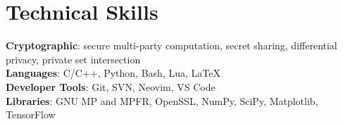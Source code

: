 \documentclass[letterpaper,11pt]{article}
\begin{document}
%
\section{Technical Skills}
\begin{itemize}[leftmargin=0.15in, label={}]
    \small{\item{
          \textbf{Cryptographic}{: secure multi-party computation, secret sharing, differential privacy, private set intersection} \\
          \textbf{Languages}{: C/C++, Python, Bash, Lua, \LaTeX} \\
          \textbf{Developer Tools}{: Git, SVN, Neovim, VS Code } \\
          \textbf{Libraries}{: GNU MP and MPFR, OpenSSL, NumPy, SciPy, Matplotlib, TensorFlow}
          }}
\end{itemize}


\end{document}
